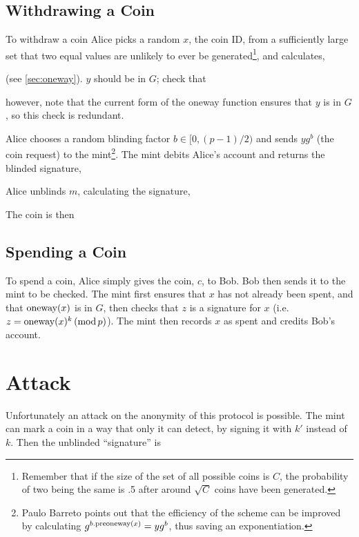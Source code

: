 \documentclass[a4paper,titlepage]{article}
\begin{document}
\subsection{Withdrawing a Coin}

To withdraw a coin Alice picks a random $x$, the coin ID, from a
sufficiently large set that two equal values are unlikely to ever be
generated\footnote{Remember that if the size of the set of all
possible coins is $C$, the probability of two being the same is .5
after around $\sqrt{C}$ coins have been generated.}, and calculates,


(see \ref{sec:oneway}). $y$ should be in $G$; check that


however, note that the current form of the oneway function ensures
that $y$ is in $G$, so this check is redundant.

Alice chooses a random blinding factor $b \in [0,(p-1)/2)$ and sends
$y g^b$ (the coin request) to the mint\footnote{Paulo Barreto points
out that the efficiency of the scheme can be improved by calculating
$g^{b.\textrm{preoneway}(x)}=y g^b$, thus saving an exponentiation.}. The mint
debits Alice's account and returns the blinded signature,


Alice unblinds $m$, calculating the signature,


The coin is then


\subsection{Spending a Coin}

To spend a coin, Alice simply gives the coin, $c$, to Bob. Bob then
sends it to the mint to be checked. The mint first ensures that $x$
has not already been spent, and that $\textrm{oneway}(x)$ is in $G$, then checks that
$z$ is a signature for $x$ (i.e. $z=\textrm{oneway}(x)^k \,(\textrm{mod}\,p)$). The mint
then records $x$ as spent and credits Bob's account.

\section{Attack}

Unfortunately an attack on the anonymity of this protocol is
possible. The mint can mark a coin in a way that only it can detect,
by signing it with $k'$ instead of $k$. Then the unblinded
``signature'' is
\end{document}
